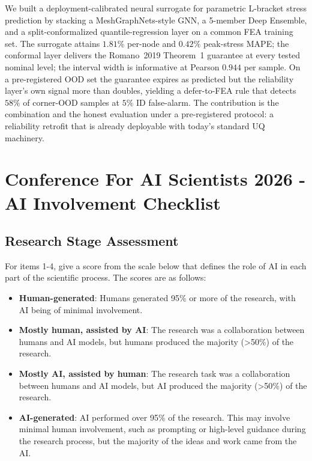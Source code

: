 \documentclass{article}
\begin{document}
We built a deployment-calibrated neural surrogate for parametric
L-bracket stress prediction by stacking a MeshGraphNets-style GNN, a
5-member Deep Ensemble, and a split-conformalized quantile-regression
layer on a common FEA training set. The surrogate attains $1.81\%$
per-node and $0.42\%$ peak-stress MAPE; the conformal layer delivers
the Romano~2019 Theorem~1 guarantee at every tested nominal level; the
interval width is informative at Pearson $0.944$ per sample. On a
pre-registered OOD set the guarantee expires as predicted but the
reliability layer's own signal more than doubles, yielding a
defer-to-FEA rule that detects $58\%$ of corner-OOD samples at $5\%$
ID false-alarm. The contribution is the combination and the honest
evaluation under a pre-registered protocol: a reliability retrofit that
is already deployable with today's standard UQ machinery.




\newpage

\section*{Conference For AI Scientists 2026 - AI Involvement Checklist}
\label{checklist_ai_involvement}

\subsection*{Research Stage Assessment}

For items 1-4, give a score from the scale below that defines the role of AI in each part of the scientific process. The scores are as follows:

\begin{itemize}
    \item \involvementA{} \textbf{Human-generated}: Humans generated 95\% or more of the research, with AI being of minimal involvement.
    \item \involvementB{} \textbf{Mostly human, assisted by AI}: The research was a collaboration between humans and AI models, but humans produced the majority (>50\%) of the research.
    \item \involvementC{} \textbf{Mostly AI, assisted by human}: The research task was a collaboration between humans and AI models, but AI produced the majority (>50\%) of the research.
    \item \involvementD{} \textbf{AI-generated}: AI performed over 95\% of the research. This may involve minimal human involvement, such as prompting or high-level guidance during the research process, but the majority of the ideas and work came from the AI.
\end{itemize}
\end{document}
